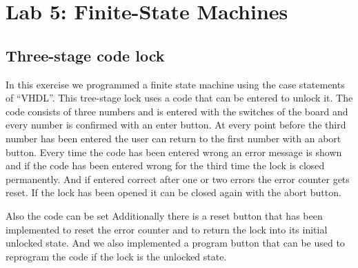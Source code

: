 \chapter{Lab 5: Finite-State Machines} \label{day5}

\section{Three-stage code lock}

In this exercise we programmed a finite state machine using the case statements of ``VHDL''. This tree-stage lock uses a code that can be entered to unlock it. The code consists of three numbers and is entered with the switches of the board and every number is confirmed with an enter button. At every point before the third number has been entered the user can return to the first number with an abort button. Every time the code has been entered wrong an error message is shown and if the code has been entered wrong for the third time the lock is closed permanently. And if entered correct after one or two errors the error counter gets reset. If the lock has been opened it can be closed again with the abort button.

Also the code can be set Additionally there is a reset button that has been implemented to reset the error counter and to return the lock into its initial unlocked state. And we also implemented a program button that can be used to reprogram the code if the lock is the unlocked state.


